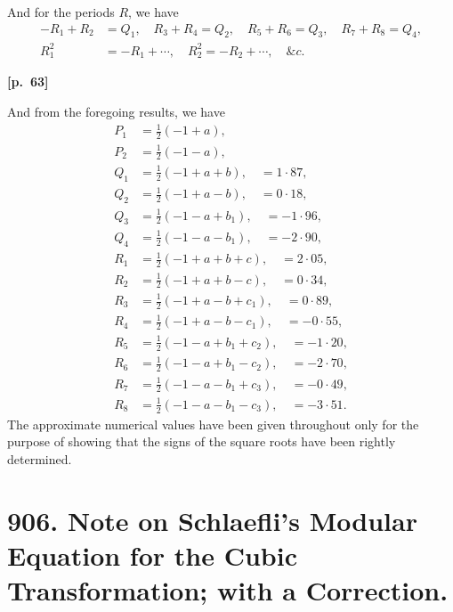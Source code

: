 \documentclass[11pt,a4paper]{article}
\theoremstyle{plain}
\begin{document}
And for the periods $R$, we have
\begin{align*}
-R_1 + R_2 &= Q_1, \quad R_3 + R_4 = Q_2, \quad R_5 + R_6 = Q_3, \quad R_7 + R_8 = Q_4, \\
R_1^2 &= -R_1 + \cdots, \quad R_2^2 = -R_2 + \cdots, \quad \&c.
\end{align*}

\vspace{0.5em}
\noindent\textbf{[p.\ 63]}

And from the foregoing results, we have
\begin{align*}
P_1 &= \tfrac{1}{2}(-1 + a), \\
P_2 &= \tfrac{1}{2}(-1 - a), \\
Q_1 &= \tfrac{1}{2}(-1 + a + b), \quad = 1\cdot 87, \\
Q_2 &= \tfrac{1}{2}(-1 + a - b), \quad = 0\cdot 18, \\
Q_3 &= \tfrac{1}{2}(-1 - a + b_1), \quad = -1\cdot 96, \\
Q_4 &= \tfrac{1}{2}(-1 - a - b_1), \quad = -2\cdot 90, \\
R_1 &= \tfrac{1}{2}(-1 + a + b + c), \quad = 2\cdot 05, \\
R_2 &= \tfrac{1}{2}(-1 + a + b - c), \quad = 0\cdot 34, \\
R_3 &= \tfrac{1}{2}(-1 + a - b + c_1), \quad = 0\cdot 89, \\
R_4 &= \tfrac{1}{2}(-1 + a - b - c_1), \quad = -0\cdot 55, \\
R_5 &= \tfrac{1}{2}(-1 - a + b_1 + c_2), \quad = -1\cdot 20, \\
R_6 &= \tfrac{1}{2}(-1 - a + b_1 - c_2), \quad = -2\cdot 70, \\
R_7 &= \tfrac{1}{2}(-1 - a - b_1 + c_3), \quad = -0\cdot 49, \\
R_8 &= \tfrac{1}{2}(-1 - a - b_1 - c_3), \quad = -3\cdot 51.
\end{align*}
The approximate numerical values have been given throughout only for the purpose of showing that the signs of the square roots have been rightly determined.

\newpage

\section*{906. Note on Schlaefli's Modular Equation for the Cubic Transformation; with a Correction.}
\end{document}
